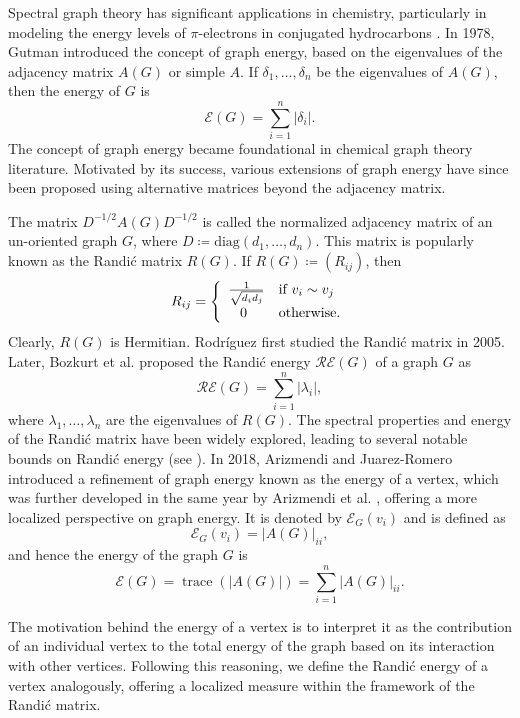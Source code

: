 \documentclass[10 pt]{article}
\numberwithin{equation}{section}
\newcommand{\trace}{\operatorname{trace}}
\begin{document}
Spectral graph theory has significant applications in chemistry, particularly in modeling the energy levels of $\pi$-electrons in conjugated hydrocarbons \cite{Coulson1940}. In 1978, Gutman \cite{Gutman1978} introduced the concept of graph energy, based on the eigenvalues of the adjacency matrix $A(G)$ or simple $A$. If $\delta_1,\ldots,\delta_n$ be the eigenvalues of $A(G)$, then the energy \cite{Gutman1978} of $G$ is
$$\mathcal{E}(G)=\sum_{i=1}^n\left|\delta_i\right|.$$
The concept of graph energy became foundational in chemical graph theory literature. Motivated by its success, various extensions of graph energy have since been proposed using alternative matrices beyond the adjacency matrix.

The matrix $D^{-1/2}A(G)D^{-1/2}$ is called the normalized adjacency matrix of an un-oriented graph $G$, where $D\coloneqq\text{diag}\left(d_1,\ldots,d_n\right)$. This matrix is popularly known as the Randi\'c matrix $R(G)$. If $R(G)\coloneqq (R_{ij})$, then
$$
R_{ij}=\left\{
  \begin{array}{ll}
    \frac{1}{\sqrt{d_id_j}} & \hbox{if $v_i \sim v_j$} \\
    \;\;\;0 & \hbox{otherwise.}
 \end{array}
\right.
$$
Clearly, $R(G)$ is Hermitian. Rodr\'{i}guez \cite{Rodriguez2005} first studied the Randi\'c matrix in 2005. Later, Bozkurt et al. \cite{Bozkurt2010} proposed the Randi\'c energy $\mathcal{RE}(G)$ of a graph $G$ as
$$\mathcal{RE}(G)=\sum\limits_{i=1}^n |\lambda_i|,$$
where $\lambda_1,\ldots,\lambda_n$ are the eigenvalues of $R(G)$. The spectral properties and energy of the Randi\'c matrix have been widely explored, leading to several notable bounds on Randi\'c energy (see \cite{Li2015, Liu2012, Das2014, Das2015, Estrada2017}). In 2018, Arizmendi and Juarez-Romero \cite{Arizmendi2018Romero} introduced a refinement of graph energy known as the energy of a vertex, which was further developed in the same year by Arizmendi et al. \cite{Arizmendi2018}, offering a more localized perspective on graph energy. It is denoted by $\mathcal{E}_G(v_i)$ and is defined as
$$\mathcal{E}_G(v_i)=|A(G)|_{ii},$$
and hence the energy of the graph $G$ is
$$\mathcal{E}(G)=\trace(|A(G)|)=\sum\limits_{i=1}^n |A(G)|_{ii}.$$

The motivation behind the energy of a vertex is to interpret it as the contribution of an individual vertex to the total energy of the graph based on its interaction with other vertices. Following this reasoning, we define the Randi\'c energy of a vertex analogously, offering a localized measure within the framework of the Randi\'c matrix.
\end{document}
